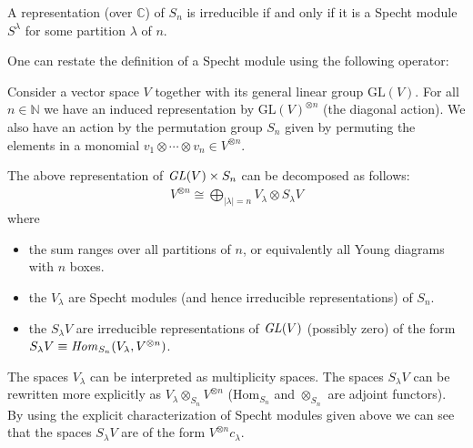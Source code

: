     \begin{property}
        A representation (over $\mathbb{C}$) of $S_n$ is irreducible if and only if it is a Specht module $S^\lambda$ for some partition $\lambda$ of $n$.
    \end{property}

    One can restate the definition of a Specht module using the following operator:

    Consider a vector space $V$ together with its general linear group $\text{GL}(V)$. For all $n\in\mathbb{N}$ we have an induced representation by $\text{GL}(V)^{\otimes n}$ (the diagonal action). We also have an action by the permutation group $S_n$ given by permuting the elements in a monomial $v_1\otimes\cdots\otimes v_n\in V^{\otimes n}$.
    \begin{theorem}
        The above representation of $\text{\emph{GL}}(V)\times S_n$ can be decomposed as follows:
        \begin{gather}
            V^{\otimes n} \cong \bigoplus_{|\lambda|=n} V_\lambda\otimes S_\lambda V
        \end{gather}
        where
        \begin{itemize}
            \item the sum ranges over all partitions of $n$, or equivalently all Young diagrams with $n$ boxes.
            \item the $V_\lambda$ are Specht modules (and hence irreducible representations) of $S_n$.
            \item the $S_\lambda V$ are irreducible representations of $\text{\emph{GL}}(V)$ (possibly zero) of the form $S_\lambda V \equiv\text{\emph{Hom}}_{S_n}(V_\lambda, V^{\otimes n})$.
        \end{itemize}
    \end{theorem}
    The spaces $V_\lambda$ can be interpreted as multiplicity spaces. The spaces $S_\lambda V$ can be rewritten more explicitly as $V_\lambda\otimes_{S_n} V^{\otimes n}$ ($\text{Hom}_{S_n}$ and $\otimes_{S_n}$ are adjoint functors). By using the explicit characterization of Specht modules given above we can see that the spaces $S_\lambda V$ are of the form $V^{\otimes n}c_\lambda$.

